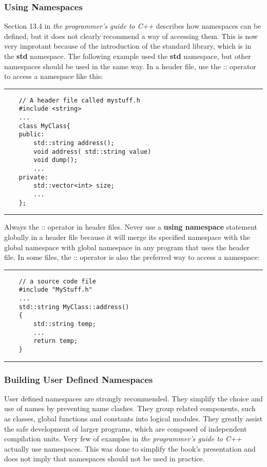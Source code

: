 	\subsubsection{Using Namespaces}
	Section 13.4 in \textit{the programmer's guide to C++} describes how namespaces can be defined, but it does not clearly recommend a way of accessing them. This is now very improtant because of the introduction of the standard library, which is in the \textbf{std} namespace. The following example used the \textbf{std} namespace, but other namespaces should be used in the same way. In a header file, use the :: operator to access a namespace like this:
	
	\noindent\vspace{1em}\hrule
	\begin{verbatim}
	// A header file called mystuff.h
	#include <string>
	...
	class MyClass{
	public:
	    std::string address();
	    void address( std::string value)
	    void dump();
	    ...
	private:
	    std::vector<int> size;
	    ...
	};
	\end{verbatim}
	\noindent\hrule\vspace{1em}
	
	Always the :: operator in header files. Never use a \textbf{using namespace} statement globally in a header file because it will merge its specified namespace with the global namespace with global namespace in any program that uses the header file. In some files, the :: operator is also the preferred way to access a namespace:
	
	\noindent\vspace{1em}\hrule
	\begin{verbatim}
	// a source code file
	#include "MyStuff.h"
	...
	std::string MyClass::address()
	{
	    std::string temp;
	    ...
	    return temp;
	}
	\end{verbatim}
	\noindent\hrule\vspace{1em}
	
	\subsubsection{Building User Defined Namespaces}
	User defined namespaces are strongly recommended. They simplify the choice and use of names by preventing name clashes. They group related components, such as classes, global functions and constants into logical modules. They greatly assist the safe development of larger programs, which are composed of independent compilation units. Very few of examples in \textit{the programmer's guide to C++} actually use namespaces. This was done to simplify the book's presentation and does not imply that namespaces should not be used in practice.
	
